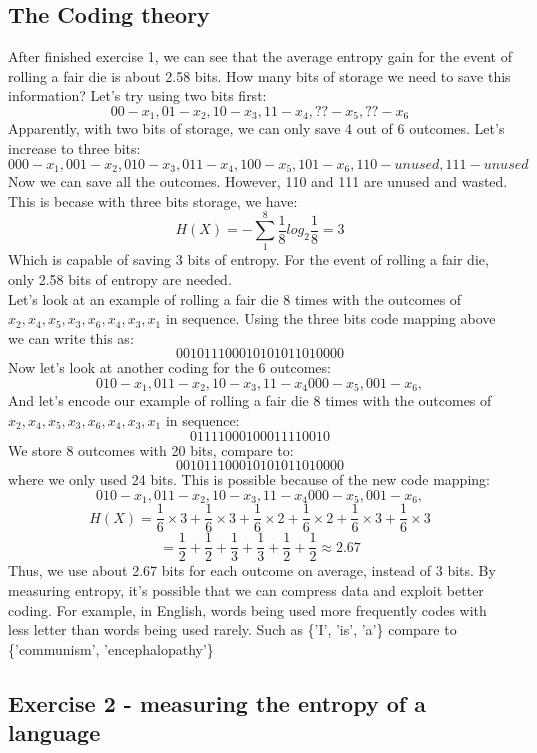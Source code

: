 \documentclass[12pt]{article}
\begin{document}
\subsection{The Coding theory}
After finished exercise 1, we can see that the average entropy gain for the event of rolling a fair die is about 2.58 bits. How many bits of storage we need to save this information? Let's try using two bits first:
\[
	00 - x_1,
	01 - x_2,
	10 - x_3,
	11 - x_4,
	?? - x_5,
	?? - x_6
\]
Apparently, with two bits of storage, we can only save 4 out of 6 outcomes. Let's increase to three bits:
\[
	000 - x_1,
	001 - x_2,
	010 - x_3,
	011 - x_4,
	100 - x_5,
	101 - x_6,
	110 - unused,
	111 - unused
\]
Now we can save all the outcomes. However, 110 and 111 are unused and wasted. This is becase with three bits storage, we have:
\[
	H(X) = - \sum_1^8 \frac{1}{8} log_2 \frac{1}{8} = 3
\]
Which is capable of saving 3 bits of entropy. For the event of rolling a fair die, only 2.58 bits of entropy are needed.\\
Let's look at an example of rolling a fair die 8 times with the outcomes of $x_2,x_4,x_5,x_3,x_6,x_4,x_3,x_1$ in sequence. Using the three bits code mapping above we can write this as:
\[
	001011100010101011010000
\]
Now let's look at another coding for the 6 outcomes:
\[
	010 - x_1,
	011 - x_2,
	10 - x_3,
	11 - x_4
	000 - x_5,
	001 - x_6,
\]
And let's encode our example of rolling a fair die 8 times with the outcomes of $x_2,x_4,x_5,x_3,x_6,x_4,x_3,x_1$ in sequence:
\[
	01111000100011110010
\]
We store 8 outcomes with 20 bits, compare to:
\[
	001011100010101011010000
\]
where we only used 24 bits. This is possible because of the new code mapping:
\[
	010 - x_1,
	011 - x_2,
	10 - x_3,
	11 - x_4
	000 - x_5,
	001 - x_6,
\]
\[
	H(X) = \frac{1}{6} \times 3 + \frac{1}{6} \times 3 + \frac{1}{6} \times 2 + \frac{1}{6} \times 2 + \frac{1}{6} \times 3 + \frac{1}{6} \times 3
\]
\[
	= \frac{1}{2} + \frac{1}{2}+ \frac{1}{3}+ \frac{1}{3}+ \frac{1}{2}+ \frac{1}{2} \approx 2.67
\]
Thus, we use about 2.67 bits for each outcome on average, instead of 3 bits. By measuring entropy, it's possible that we can compress data and exploit better coding. For example, in English, words being used more frequently codes with less letter than words being used rarely. Such as \{'I', 'is', 'a'\} compare to \{'communism', 'encephalopathy'\}

\subsection{Exercise 2 - measuring the entropy of a language}
\end{document}
